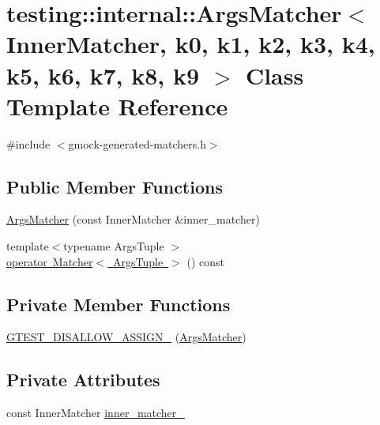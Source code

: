 \hypertarget{classtesting_1_1internal_1_1_args_matcher}{}\section{testing\+::internal\+::Args\+Matcher$<$ Inner\+Matcher, k0, k1, k2, k3, k4, k5, k6, k7, k8, k9 $>$ Class Template Reference}
\label{classtesting_1_1internal_1_1_args_matcher}


{\ttfamily \#include $<$gmock-\/generated-\/matchers.\+h$>$}

\subsection*{Public Member Functions}
\begin{DoxyCompactItemize}
\item 
\mbox{\hyperlink{classtesting_1_1internal_1_1_args_matcher_a2879d7455f2da2a5a2f2b6759dbc0561}{Args\+Matcher}} (const Inner\+Matcher \&inner\+\_\+matcher)
\item 
{\footnotesize template$<$typename Args\+Tuple $>$ }\\\mbox{\hyperlink{classtesting_1_1internal_1_1_args_matcher_ad55698b0de384a9d8875cef5b172cb4a}{operator Matcher$<$ Args\+Tuple $>$}} () const
\end{DoxyCompactItemize}
\subsection*{Private Member Functions}
\begin{DoxyCompactItemize}
\item 
\mbox{\hyperlink{classtesting_1_1internal_1_1_args_matcher_aa928e2846eafb7ddcda795d7c3dd526c}{G\+T\+E\+S\+T\+\_\+\+D\+I\+S\+A\+L\+L\+O\+W\+\_\+\+A\+S\+S\+I\+G\+N\+\_\+}} (\mbox{\hyperlink{classtesting_1_1internal_1_1_args_matcher}{Args\+Matcher}})
\end{DoxyCompactItemize}
\subsection*{Private Attributes}
\begin{DoxyCompactItemize}
\item 
const Inner\+Matcher \mbox{\hyperlink{classtesting_1_1internal_1_1_args_matcher_ac76e55e4b52e18fa0c57aad4814a8a70}{inner\+\_\+matcher\+\_\+}}
\end{DoxyCompactItemize}



